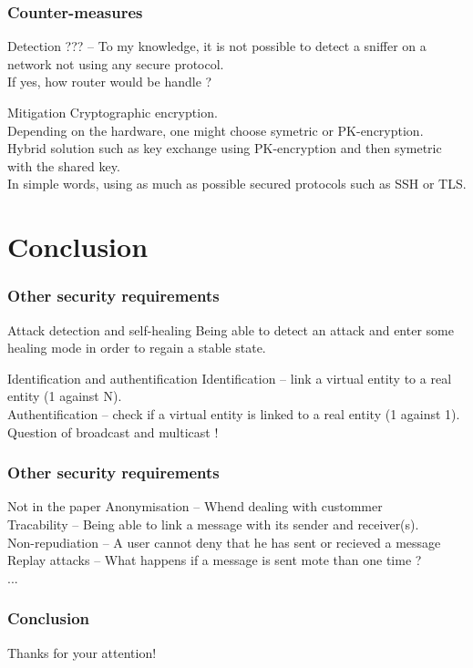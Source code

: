 \documentclass{beamer}
\begin{document}
\begin{frame}
    \frametitle{Counter-measures}

    \begin{block}{Detection}
        ??? -- To my knowledge, it is not possible to detect a sniffer on a network not using any secure protocol.\\
        If yes, how router would be handle ?
    \end{block}
    \vfill
    \begin{block}{Mitigation}
        Cryptographic encryption.\\
        \medskip
        Depending on the hardware, one might choose symetric or PK-encryption.\\
        Hybrid solution such as key exchange using PK-encryption and then symetric with the shared key.\\
        In simple words, using as much as possible secured protocols such as SSH or TLS.
    \end{block}
\end{frame}

\section{Conclusion}

\begin{frame}
    \frametitle{Other security requirements}

    \begin{block}{Attack detection and self-healing}
        Being able to detect an attack and enter some healing mode in order to regain a stable state.
    \end{block}
    \vfill
    \begin{block}{Identification and authentification}
        Identification -- link a virtual entity to a real entity (1 against N).\\
        \medskip
        Authentification -- check if a virtual entity is linked to a real entity (1 against 1).\\
        \medskip
        Question of broadcast and multicast !
    \end{block}
\end{frame}

\begin{frame}
    \frametitle{Other security requirements}

    \begin{block}{Not in the paper}
        Anonymisation -- Whend dealing with custommer\\
        \medskip
        Tracability -- Being able to link a message with its sender and receiver(s).\\
        \medskip
        Non-repudiation -- A user cannot deny that he has sent or recieved a message\\
        \medskip
        Replay attacks -- What happens if a message is sent mote than one time ?\\
        \medskip
        ...
    \end{block}
\end{frame}

\begin{frame}
    \frametitle{Conclusion}

    \begin{center}
        Thanks for your attention!
    \end{center}
\end{frame}
\end{document}
